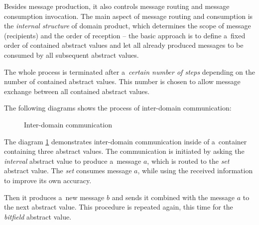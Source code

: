 \documentclass[12pt,oneside]{fithesis2}
\theoremstyle{definition}
\begin{document}
Besides message production, it also controls message routing and message consumption invocation. The main aspect of message routing and consumption is the \textit{internal structure} of domain product, which determines the scope of message (recipients) and the order of reception -- the basic approach is to define a~fixed order of contained abstract values and let all already produced messages to be consumed by all subsequent abstract values.

The whole process is terminated after a~\textit{certain number of steps} depending on the number of contained abstract values. This number is chosen to allow message exchange between all contained abstract values.

\vspace{1\baselineskip} %

The following diagrams shows the process of inter-domain communication:

\begin{figure}[ht!]
  \centering
  \caption{Inter-domain communication}
  \label{fig:communication}
\end{figure}

The diagram \ref{fig:communication} demonstrates inter-domain communication inside of a~container containing three abstract values. The communication is initiated by asking the \textit{interval} abstract value to produce a~message $a$, which is routed to the \textit{set} abstract value. The \textit{set} consumes message $a$, while using the received information to improve its own accuracy.

Then it produces a~new message $b$ and sends it combined with the message $a$ to the next abstract value. This procedure is repeated again, this time for the \textit{bitfield} abstract value.
\end{document}

